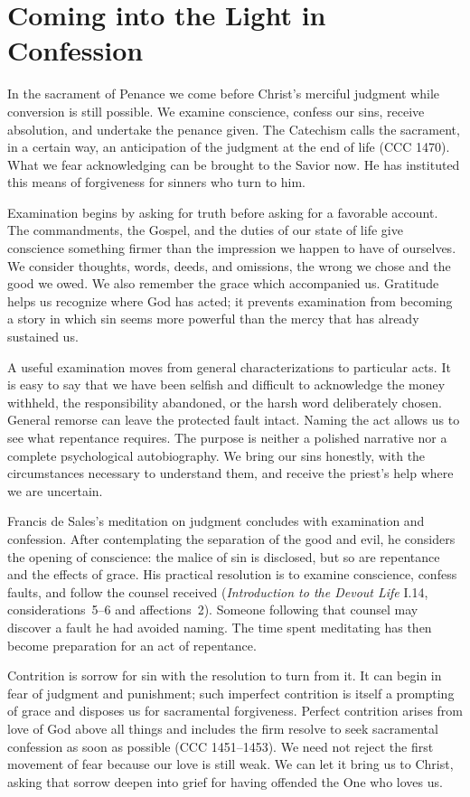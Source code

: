 \section{Coming into the Light in Confession}

In the sacrament of Penance we come before Christ's merciful judgment while conversion is still possible. We examine conscience, confess our sins, receive absolution, and undertake the penance given. The Catechism calls the sacrament, in a certain way, an anticipation of the judgment at the end of life (CCC 1470). What we fear acknowledging can be brought to the Savior now. He has instituted this means of forgiveness for sinners who turn to him.

Examination begins by asking for truth before asking for a favorable account. The commandments, the Gospel, and the duties of our state of life give conscience something firmer than the impression we happen to have of ourselves. We consider thoughts, words, deeds, and omissions, the wrong we chose and the good we owed. We also remember the grace which accompanied us. Gratitude helps us recognize where God has acted; it prevents examination from becoming a story in which sin seems more powerful than the mercy that has already sustained us.

A useful examination moves from general characterizations to particular acts. It is easy to say that we have been selfish and difficult to acknowledge the money withheld, the responsibility abandoned, or the harsh word deliberately chosen. General remorse can leave the protected fault intact. Naming the act allows us to see what repentance requires. The purpose is neither a polished narrative nor a complete psychological autobiography. We bring our sins honestly, with the circumstances necessary to understand them, and receive the priest's help where we are uncertain.

Francis de Sales's meditation on judgment concludes with examination and confession. After contemplating the separation of the good and evil, he considers the opening of conscience: the malice of sin is disclosed, but so are repentance and the effects of grace. His practical resolution is to examine conscience, confess faults, and follow the counsel received (\emph{Introduction to the Devout Life} I.14, considerations~5--6 and affections~2). Someone following that counsel may discover a fault he had avoided naming. The time spent meditating has then become preparation for an act of repentance.

Contrition is sorrow for sin with the resolution to turn from it. It can begin in fear of judgment and punishment; such imperfect contrition is itself a prompting of grace and disposes us for sacramental forgiveness. Perfect contrition arises from love of God above all things and includes the firm resolve to seek sacramental confession as soon as possible (CCC 1451--1453). We need not reject the first movement of fear because our love is still weak. We can let it bring us to Christ, asking that sorrow deepen into grief for having offended the One who loves us.

